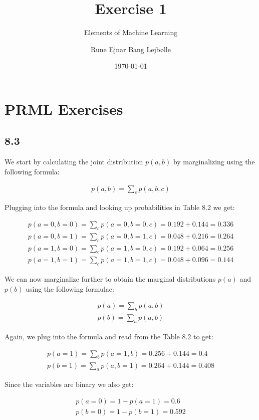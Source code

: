 \documentclass[a4paper, 12pt]{article}
\author{Rune Ejnar Bang Lejbølle}
\title{Exercise 1}
\subtitle{Elements of Machine Learning}
\date{\today}
\begin{document}
	
\maketitle


\section{PRML Exercises}
\subsection{8.3}

We start by calculating the joint distribution $p(a,b)$ by marginalizing using the following formula:

\begin{align}
	p(a,b) = \sum_c p(a,b,c)
\end{align}

Plugging into the formula and looking up probabilities in Table 8.2 we get:

\begin{align}
	p(a=0,b=0) = \sum_c p(a=0,b=0,c) = 0.192 + 0.144 = 0.336\\
	p(a=0,b=1) = \sum_c p(a=0,b=1,c) = 0.048 + 0.216 = 0.264\\
	p(a=1,b=0) = \sum_c p(a=1,b=0,c) = 0.192 + 0.064 = 0.256\\
	p(a=1,b=1) = \sum_c p(a=1,b=1,c) = 0.048 + 0.096 = 0.144
\end{align}

We can now marginalize further to obtain the marginal distributions $p(a)$ and $p(b)$ using the following formulae:

\begin{align}
	p(a) = \sum_b p(a,b)\\
	p(b) = \sum_a p(a,b)
\end{align}

Again, we plug into the formula and read from the Table 8.2 to get:

\begin{align}
	p(a=1) = \sum_b p(a=1,b) = 0.256 + 0.144 = 0.4\\
	p(b=1) = \sum_a p(a,b=1) = 0.264 + 0.144 = 0.408
\end{align}

Since the variables are binary we also get:

\begin{align}
	p(a=0) = 1 - p(a=1) = 0.6\\
	p(b=0) = 1 - p(b=1) = 0.592
\end{align}
\end{document}
